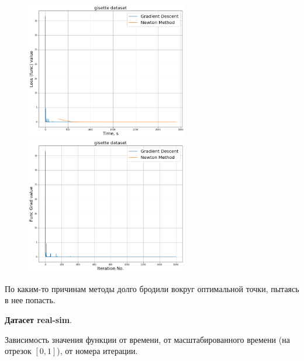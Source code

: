 \documentclass[14pt]{article}
\begin{document}
 \begin{figure}[h]
	\centering
	\includegraphics[height=6cm]{gisette_grad.png}
	\includegraphics[height=6cm]{gisette_grad_no.png}
\end{figure}

 По каким-то причинам методы долго бродили вокруг оптимальной точки, пытаясь в нее попасть.
 
 \newpage
 
 \textbf{Датасет real-sim}.

Зависимость значения функции от времени, от масштабированного времени (на отрезок $[0, 1]$), от номера итерации.
\end{document}
